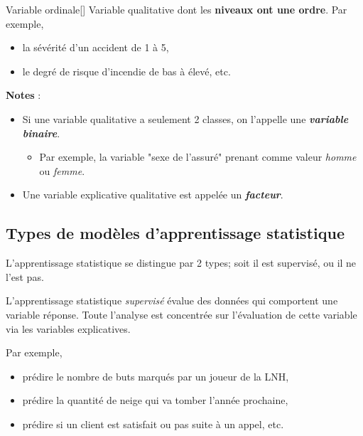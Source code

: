 \documentclass[french]{article}
\begin{document}
\begin{multicols*}{2}
\begin{definitionNOHFILLsub}
\begin{definitionGENERAL}{Variable ordinale}[]
Variable qualitative dont les \textbf{niveaux ont une ordre}. Par exemple, 
\begin{itemize}
	\item	la sévérité d'un accident de 1 à 5,
	\item	le degré de risque d'incendie de bas à élevé, etc.
\end{itemize}
\end{definitionGENERAL}

\bigskip

\textbf{Notes} :
\begin{itemize}
	\item	Si une variable qualitative a seulement 2 classes, on l'appelle une \textbf{\textit{variable binaire}}.
		\begin{itemize}
		\item	Par exemple, la variable "sexe de l'assuré" prenant comme valeur \textit{homme} ou \textit{femme}.
		\end{itemize}
	\item	Une variable explicative qualitative est appelée un \textit{\textbf{facteur}}.
\end{itemize}
\end{definitionNOHFILLsub}



\columnbreak
\subsection{Types de modèles d'apprentissage statistique}
L'apprentissage statistique se distingue par 2 types; soit il est supervisé, ou il ne l'est pas.

\begin{definitionNOHFILLsub}
L'apprentissage statistique \textit{supervisé} évalue des données qui comportent une variable réponse. Toute l'analyse est concentrée sur l'évaluation de cette variable via les variables explicatives. 

\bigskip

Par exemple, 
\begin{itemize}
	\item	prédire le nombre de buts marqués par un joueur de la LNH,
	\item	prédire la quantité de neige qui va tomber l'année prochaine,
	\item	prédire si un client est satisfait ou pas suite à un appel, etc.
\end{itemize}
\end{definitionNOHFILLsub}


\end{multicols*}
\end{document}
